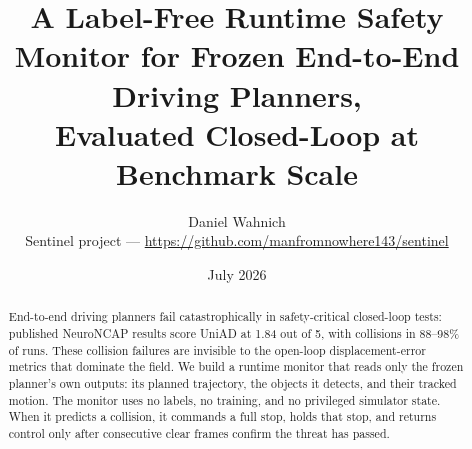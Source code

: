 \documentclass[11pt]{article}
\title{A Label-Free Runtime Safety Monitor for Frozen End-to-End Driving Planners,\\
Evaluated Closed-Loop at Benchmark Scale}
\author{Daniel Wahnich\\
\small Sentinel project --- \url{https://github.com/manfromnowhere143/sentinel}}
\date{July 2026}
\begin{document}
\maketitle

\begin{abstract}
End-to-end driving planners fail catastrophically in safety-critical closed-loop tests:
published NeuroNCAP results score UniAD at 1.84 out of 5, with collisions in 88--98\% of runs.
These collision failures are invisible to the open-loop displacement-error metrics that
dominate the field. We build a runtime monitor that reads only the frozen planner's own
outputs: its planned trajectory, the objects it detects, and their tracked motion. The monitor
uses no labels, no training, and no privileged simulator state. When it predicts a collision,
it commands a full stop, holds that stop, and returns control only after consecutive clear
frames confirm the threat has passed.


\end{abstract}
\end{document}

